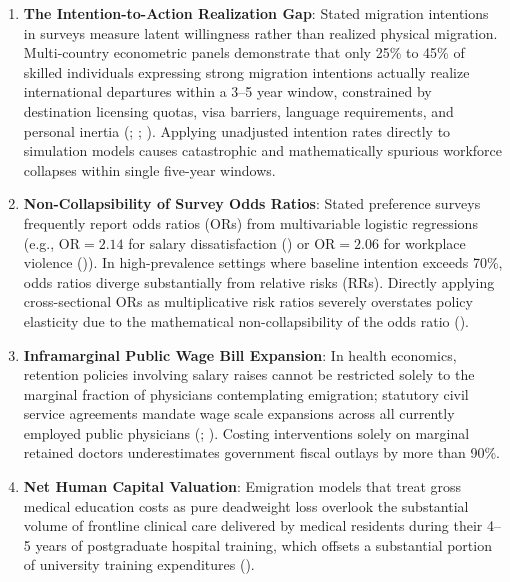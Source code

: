 \documentclass[
  11pt,
  a4paper]{article}
\providecommand{\tightlist}{%
  \setlength{\itemsep}{0pt}\setlength{\parskip}{0pt}}
\begin{document}
\begin{enumerate}
\def\labelenumi{\arabic{enumi}.}
\tightlist
\item
  \textbf{The Intention-to-Action Realization Gap}: Stated migration
  intentions in surveys measure latent willingness rather than realized
  physical migration. Multi-country econometric panels demonstrate that
  only 25\% to 45\% of skilled individuals expressing strong migration
  intentions actually realize international departures within a 3--5
  year window, constrained by destination licensing quotas, visa
  barriers, language requirements, and personal inertia
  (;
  ;
  ). Applying unadjusted
  intention rates directly to simulation models causes catastrophic and
  mathematically spurious workforce collapses within single five-year
  windows.
\item
  \textbf{Non-Collapsibility of Survey Odds Ratios}: Stated preference
  surveys frequently report odds ratios (ORs) from multivariable
  logistic regressions (e.g., \(\text{OR} = 2.14\) for salary
  dissatisfaction () or \(\text{OR} = 2.06\) for workplace violence
  ()). In high-prevalence
  settings where baseline intention exceeds 70\%, odds ratios diverge
  substantially from relative risks (RRs). Directly applying
  cross-sectional ORs as multiplicative risk ratios severely overstates
  policy elasticity due to the mathematical non-collapsibility of the
  odds ratio ().
\item
  \textbf{Inframarginal Public Wage Bill Expansion}: In health
  economics, retention policies involving salary raises cannot be
  restricted solely to the marginal fraction of physicians contemplating
  emigration; statutory civil service agreements mandate wage scale
  expansions across all currently employed public physicians
  (;
  ). Costing
  interventions solely on marginal retained doctors underestimates
  government fiscal outlays by more than 90\%.
\item
  \textbf{Net Human Capital Valuation}: Emigration models that treat
  gross medical education costs as pure deadweight loss overlook the
  substantial volume of frontline clinical care delivered by medical
  residents during their 4--5 years of postgraduate hospital training,
  which offsets a substantial portion of university training
  expenditures ().
\end{enumerate}
\end{document}
